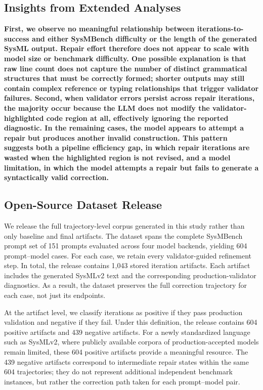 \subsection{Insights from Extended Analyses}
\textbf{First, we observe no meaningful relationship between iterations-to-success and either SysMBench difficulty or the length of the generated SysML output. Repair effort therefore does not appear to scale with model size or benchmark difficulty. One possible explanation is that raw line count does not capture the number of distinct grammatical structures that must be correctly formed; shorter outputs may still contain complex reference or typing relationships that trigger validator failures.
Second, when validator errors persist across repair iterations, the majority occur because the LLM does not modify the validator-highlighted code region at all, effectively ignoring the reported diagnostic. In the remaining cases, the model appears to attempt a repair but produces another invalid construction. This pattern suggests both a pipeline efficiency gap, in which repair iterations are wasted when the highlighted region is not revised, and a model limitation, in which the model attempts a repair but fails to generate a syntactically valid correction.}

\subsection{Open-Source Dataset Release}

We release the full trajectory-level corpus generated in this study rather than only baseline and final artifacts. The dataset spans the complete SysMBench prompt set of 151 prompts evaluated across four model backends, yielding 604 prompt--model cases. For each case, we retain every validator-guided refinement step. In total, the release contains 1,043 stored iteration artifacts. Each artifact includes the generated SysMLv2 text and the corresponding production-validator diagnostics. As a result, the dataset preserves the full correction trajectory for each case, not just its endpoints.

At the artifact level, we classify iterations as positive if they pass production validation and negative if they fail. Under this definition, the release contains 604 positive artifacts and 439 negative artifacts. For a newly standardized language such as SysMLv2, where publicly available corpora of production-accepted models remain limited, these 604 positive artifacts provide a meaningful resource. The 439 negative artifacts correspond to intermediate repair states within the same 604 trajectories; they do not represent additional independent benchmark instances, but rather the correction path taken for each prompt--model pair.

